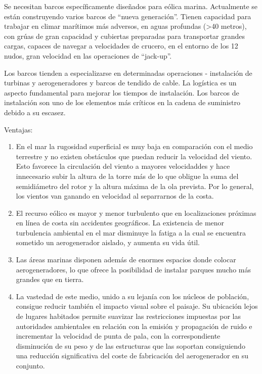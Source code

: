 Se necesitan barcos específicamente diseñados para eólica marina. Actualmente se están construyendo varios barcos de ``nueva generación''. Tienen capacidad para trabajar en climar marítimos más adversos, en aguas profundas (>40 metros), con grúas de gran capacidad y cubiertas preparadas para transportar grandes cargas, capaces de navegar a velocidades de crucero, en el entorno de los 12 nudos, gran velocidad en las operaciones de ``jack-up''.

Los barcos tienden a especializarse en determinadas operaciones - instalación de turbinas y aerogeneradores y barcos de tendido de cable. La logística es un aspecto fundamental para mejorar los tiempos de instalación. Los barcos de instalación son uno de los elementos más críticos en la cadena de suministro debido a su escasez.

Ventajas:
\begin{enumerate}
    \item En el mar la rugosidad superficial es muy baja en comparación con el medio terrestre y no existen obstáculos que puedan reducir la velocidad del viento. Esto favorece la circulación del viento a mayores velocidaddes y hace innecesario subir la altura de la torre más de lo que obligue la suma del semidiámetro del rotor y la altura máxima de la ola prevista. Por lo general, los vientos van ganando en velocidad al separrarnos de la costa.
    \item El recurso eólico es mayor y menor turbulento que en localizaciones próximas en línea de costa sin accidentes geográficos. La existencia de menor turbulencia ambiental en el mar disminuye la fatiga a la cual se encuentra sometido un aerogenerador aislado, y aumenta su vida útil.
    \item Las áreas marinas disponen además de enormes espacios donde colocar aerogeneradores, lo que ofrece la posibilidad de instalar parques mucho más grandes que en tierra.
    \item La vastedad de este medio, unido a su lejanía con los núcleos de población, consigue reducir también el impacto visual sobre el paisaje. Su ubicación lejos de lugares habitados permite suavizar las restricciones impuestas por las autoridades ambientales en relación con la emisión y propagación de ruido e incrementar la velocidad de punta de pala, con la correspondiente disminución de su peso y de las estructuras que las soportan consiguiendo una reducción significativa del coste de fabricación del aerogenerador en su conjunto.
\end{enumerate}

